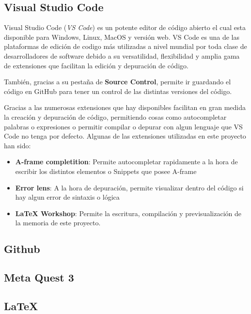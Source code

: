 \documentclass[a4paper, 12pt]{book}
\begin{document}
\subsection{Visual Studio Code}
\label{subsec: visualstudiocode}

Visual Studio Code (\textit{VS Code}) es un potente editor de código abierto el cual esta disponible para Windows, Linux, MacOS y versión web. VS Code es una de las plataformas de edición de codigo más utilizadas a nivel mundial 
por toda clase de desarrolladores de software debido a su versatilidad, flexibilidad y amplia gama de extensiones que facilitan la edición y depuración de código.

También, gracias a su pestaña de \textbf{Source Control}, permite ir guardando el código en GitHub para tener un control de las distintas versiones del código. 

Gracias a las numerosas extensiones que hay disponibles facilitan en gran medida la creación y depuración de código, permitiendo cosas como autocompletar palabras o expresiones o permitir compilar o depurar con algun lenguaje que VS Code no tenga por defecto.
Algunas de las extensiones utilizadas en este proyecto han sido: 
\begin{itemize}
  \item \textbf{A-frame completition}: Permite autocompletar rapidamente a la hora de escribir los distintos elementos o Snippets que posee A-frame
  \item \textbf{Error lens}: A la hora de depuración, permite visualizar dentro del código si hay algun error de sintaxis o lógica 
  \item \textbf{LaTeX Workshop}: Permite la escritura, compilación y previsualización de la memoria de este proyecto.
\end{itemize}

\subsection{Github}
\label{subsect:github}

\subsection{Meta Quest 3}
\label{subsec:metaquest}

\subsection{LaTeX}
\label{subsec:latex}
\end{document}
